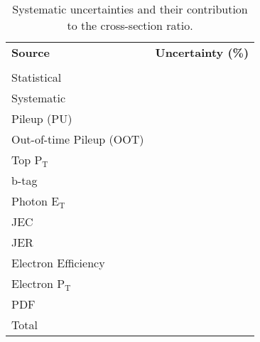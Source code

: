 \begin{table}[h!] \label{tab-systuncerts}
\centering
\begin{tabular}{|l|c|c|}
\hline
\textbf{Source} & \multicolumn{2}{c|}{\textbf{Uncertainty (\%)}} \\ \cline{2-3}
 &  & \\
\hline
Statistical & & \\
\hline
Systematic & & \\
\hline
Pileup (PU) & & \\
Out-of-time Pileup (OOT) & & \\
Top P$_{\text{T}}$ & & \\
b-tag & & \\
Photon E$_{\text{T}}$ & & \\
JEC & & \\
JER & & \\
Electron Efficiency & & \\
Electron P$_{\text{T}}$ & & \\
PDF & & \\
\hline
Total & & \\
\hline
\end{tabular} 
\caption{Systematic uncertainties and their contribution to the cross-section ratio.}
\end{table}


